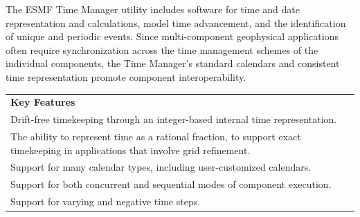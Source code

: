 
The ESMF Time Manager utility includes software for time and date 
representation and calculations, model time advancement, and the 
identification of unique and periodic events.  Since multi-component 
geophysical applications often require synchronization across
the time management schemes of the individual components, the 
Time Manager's standard calendars and consistent time representation 
promote component interoperability.
\begin{center}  
\begin{tabular}{|p{6in}|}
\hline
\vspace{.02in}
{\bf Key Features} \\[.02in]
Drift-free timekeeping through an integer-based internal time 
representation. \\
The ability to represent time as a rational fraction, to support 
exact timekeeping in applications that involve grid refinement. \\
Support for many calendar types, including user-customized calendars. \\
Support for both concurrent and sequential modes of component execution. \\
Support for varying and negative time steps. \\[.03in] \hline
\end{tabular}
\end{center}

